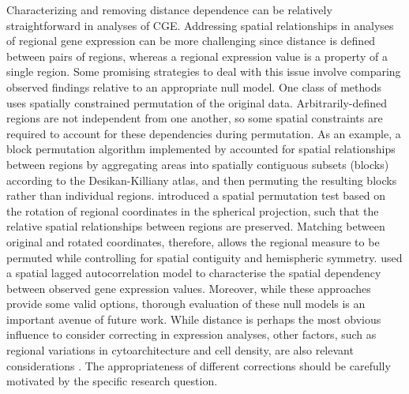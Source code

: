Characterizing and removing distance dependence can be relatively straightforward in analyses of CGE. Addressing spatial relationships in analyses of regional gene expression can be more challenging since distance is defined between pairs of regions, whereas a regional expression value is a property of a single region. Some promising strategies to deal with this issue involve comparing observed findings relative to an appropriate null model. One class of methods uses spatially constrained permutation of the original data. Arbitrarily-defined regions are not independent from one another, so some spatial constraints are required to account for these dependencies during permutation. As an example, a block permutation algorithm implemented by \citet{Vertes2016b} accounted for spatial relationships between regions by aggregating areas into spatially contiguous subsets (blocks) according to the Desikan-Killiany atlas, and then permuting the resulting blocks rather than individual regions. \citet{Vasa2018} introduced a spatial permutation test based on the rotation of regional coordinates in the spherical projection, such that the relative spatial relationships between regions are preserved. Matching between original and rotated coordinates, therefore, allows the regional measure to be permuted while controlling for spatial contiguity and hemispheric symmetry. \citet{Burt2018} used a spatial lagged autocorrelation model to characterise the spatial dependency between observed gene expression values. Moreover, while these approaches provide some valid options, thorough evaluation of these null models is an important avenue of future work. While distance is perhaps the most obvious influence to consider correcting in expression analyses, other factors, such as regional variations in cytoarchitecture and cell density, are also relevant considerations \citep{Barbas2015,Burt2018}. The appropriateness of different corrections should be carefully motivated by the specific research question.

